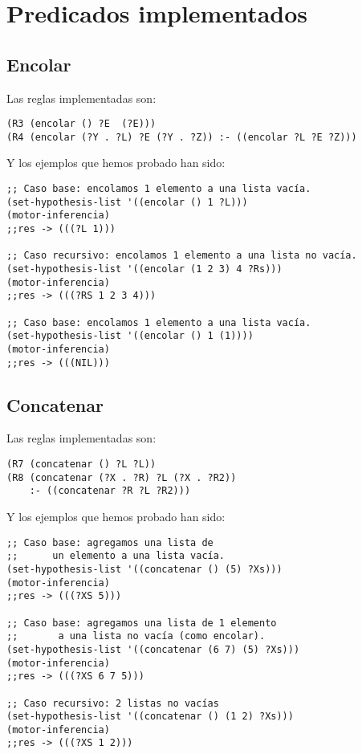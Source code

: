 \documentclass[nochap]{apuntes}
\begin{document}
\section{Predicados implementados}

\subsection*{Encolar}
Las reglas implementadas son:\\
\begin{lstlisting}[frame=single]
(R3 (encolar () ?E  (?E)))
(R4 (encolar (?Y . ?L) ?E (?Y . ?Z)) :- ((encolar ?L ?E ?Z)))
\end{lstlisting}

Y los ejemplos que hemos probado han sido:\\

\begin{lstlisting}[frame=single]
;; Caso base: encolamos 1 elemento a una lista vacía.
(set-hypothesis-list '((encolar () 1 ?L)))
(motor-inferencia)
;;res -> (((?L 1)))

;; Caso recursivo: encolamos 1 elemento a una lista no vacía.
(set-hypothesis-list '((encolar (1 2 3) 4 ?Rs)))
(motor-inferencia)
;;res -> (((?RS 1 2 3 4)))

;; Caso base: encolamos 1 elemento a una lista vacía.
(set-hypothesis-list '((encolar () 1 (1))))
(motor-inferencia)
;;res -> (((NIL)))
\end{lstlisting}

\subsection*{Concatenar}
Las reglas implementadas son:\\
\begin{lstlisting}[frame=single]
(R7 (concatenar () ?L ?L))
(R8 (concatenar (?X . ?R) ?L (?X . ?R2)) 
	:- ((concatenar ?R ?L ?R2)))
\end{lstlisting}
Y los ejemplos que hemos probado han sido:\\

\begin{lstlisting}[frame=single]
;; Caso base: agregamos una lista de 
;;		un elemento a una lista vacía.
(set-hypothesis-list '((concatenar () (5) ?Xs)))
(motor-inferencia)
;;res -> (((?XS 5)))

;; Caso base: agregamos una lista de 1 elemento
;;		 a una lista no vacía (como encolar).
(set-hypothesis-list '((concatenar (6 7) (5) ?Xs)))
(motor-inferencia)
;;res -> (((?XS 6 7 5)))

;; Caso recursivo: 2 listas no vacías
(set-hypothesis-list '((concatenar () (1 2) ?Xs)))
(motor-inferencia)
;;res -> (((?XS 1 2)))
\end{lstlisting}
\end{document}

